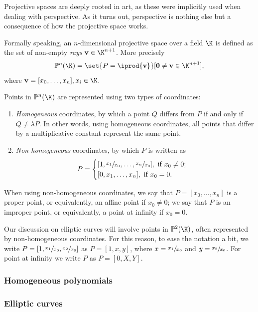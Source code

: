 \documentclass{subfiles}
\begin{document}
    Projective spaces are deeply rooted in art,
        as these were implicitly used when dealing with perspective.
        As it turns out,
        perspective is nothing else but a consequence of how the projective space works.

    Formally speaking, an \(n\)-dimensional projective space over a field \(\K\) is defined 
        as the set of non-empty \emph{rays} \(\mathbf{v} \in \K^{n + 1}\).
        More precisely 
        \[
            \mathbb{P}^{n}(\K) = \set{P = \iprod{\mathbf{v}}}[\mathbf{0} \ne \mathbf{v}  \in \K^{n + 1}],
        \]
        where \(\mathbf{v} = [x_{0}, \ldots, x_{n}], x_{i} \in \K\).

    Points in \(\mathbb{P}^{n}(\K)\) are represented using two types of coordinates:
        \begin{enumerate}
            \item \emph{Homogeneous} coordinates, by which a point \(Q\) differs from \(P\)
                if and only if \(Q \ne \lambda P\). In other words,
                using homogeneous coordinates,
                all points that differ by a multiplicative constant represent the same point.

            \item \emph{Non-homogeneous} coordinates, by which \(P\) is written as 
                \[ P = \begin{cases}
                    [1, \sfrac{x_{1}}{x_{0}}, \ldots, \sfrac{x_{n}}{x_{0}}], \text{ if } x_{0} \ne 0; \\
                    [0, x_{1}, \ldots, x_{n}], \text{ if } x_{0} = 0.
                \end{cases}\]
        \end{enumerate}
        When using non-homogeneous coordinates, 
        we say that \(P = [x_{0}, \ldots, x_{n}]\) is a proper point, or equivalently,
        an affine point if \(x_{0} \ne 0\); we say that \(P\) is an improper point,
        or equivalently, a point at infinity if \(x_{0} = 0\).

    Our discussion on elliptic curves will involve points in \(\mathbb{P}^{2}(\K)\),
        often represented by non-homogeneous coordinates.
        For this reason, to ease the notation a bit, 
        we write \(P = [1, \sfrac{x_{1}}{x_{0}}, \sfrac{x_{2}}{x_{0}}]\) as
        \(P = [1, x, y]\), where \(x = \sfrac{x_{1}}{x_{0}}\) and \(y = \sfrac{x_{2}}{x_{0}}\).
        For point at infinity we write \(P\) as \(P = [0, X, Y]\).

    \subsubsection{Homogeneous polynomials}
    

    \subsubsection{Elliptic curves}
    
        
\end{document}
